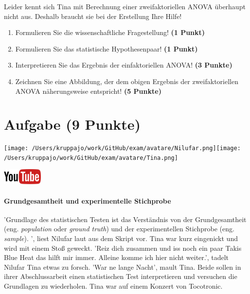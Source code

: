 \documentclass[a4paper, 9pt]{scrartcl}\usepackage[]{graphicx}\usepackage[]{xcolor}
\begin{document}
\vspace{1ex}

Leider kennt sich Tina mit Berechnung einer zweifaktoriellen ANOVA überhaupt nicht aus. Deshalb braucht sie bei der Erstellung Ihre Hilfe! 

\begin{enumerate}
  \item Formulieren Sie die wissenschaftliche Fragestellung! \textbf{(1 Punkt)}
  \item Formulieren Sie das statistische Hypothesenpaar! \textbf{(1 Punkt)}
\item Interpretieren Sie das Ergebnis der einfaktoriellen ANOVA! \textbf{(3 Punkte)} 
\item Zeichnen Sie eine Abbildung, der dem obigen Ergebnis der
  zweifaktoriellen ANOVA näherungsweise entspricht! \textbf{(5 Punkte)}
\end{enumerate}
 
\clearpage

\section{Aufgabe \hfill (9 Punkte)}


 
\begin{minipage}[t]{0.5\textwidth}
\texttt{[image: /Users/kruppajo/work/GitHub/exam/avatare/Nilufar.png]}\hspace{-4mm}\texttt{[image: /Users/kruppajo/work/GitHub/exam/avatare/Tina.png]}
\end{minipage}
\begin{minipage}[t]{0.5\textwidth}
\hfill
\href{https://youtu.be/aHVYuFKTqZs}{\includegraphics[width = 2cm]{img/youtube}}
\end{minipage}



\paragraph{Grundgesamtheit und experimentelle Stichprobe}

'Grundlage des statistischen Testen ist das Verständnis von der Grundgesamtheit (eng. \textit{population} oder \textit{ground truth}) und der experimentellen Stichprobe (eng. \textit{sample}). ', liest Nilufar laut aus dem Skript vor. Tina war kurz eingenickt und wird mit einem Stoß geweckt. 'Reiz dich zusammen und iss noch ein paar Takis Blue Heat das hilft mir immer. Alleine komme ich hier nicht weiter.', tadelt Nilufar Tina etwas zu forsch. 'War ne lange Nacht', mault Tina. Beide sollen in ihrer Abschlussarbeit einen statistischen Test interpretieren und versuchen die Grundlagen zu wiederholen. Tina war auf einem Konzert von Tocotronic.
\end{document}
